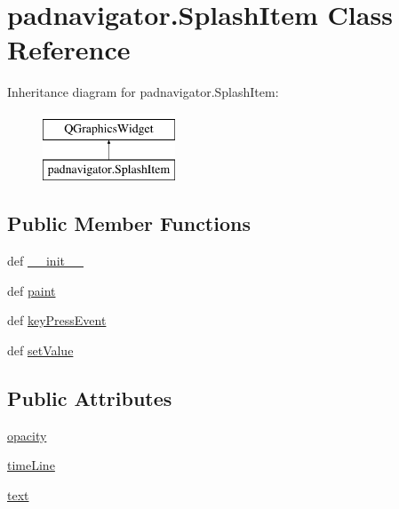 \hypertarget{classpadnavigator_1_1SplashItem}{}\section{padnavigator.\+Splash\+Item Class Reference}
\label{classpadnavigator_1_1SplashItem}
Inheritance diagram for padnavigator.\+Splash\+Item\+:\begin{figure}[H]
\begin{center}
\leavevmode
\includegraphics[height=2.000000cm]{classpadnavigator_1_1SplashItem}
\end{center}
\end{figure}
\subsection*{Public Member Functions}
\begin{DoxyCompactItemize}
\item 
def \hyperlink{classpadnavigator_1_1SplashItem_aa678bd9fc04cf7fa7a16662b0a31145d}{\+\_\+\+\_\+init\+\_\+\+\_\+}
\item 
def \hyperlink{classpadnavigator_1_1SplashItem_aa025a4136c98b96b0d553bb9687ef945}{paint}
\item 
def \hyperlink{classpadnavigator_1_1SplashItem_adbfbf41adfe7b346653c47d69cc3293c}{key\+Press\+Event}
\item 
def \hyperlink{classpadnavigator_1_1SplashItem_af2b6f16a576fdfcc10b2963225afa318}{set\+Value}
\end{DoxyCompactItemize}
\subsection*{Public Attributes}
\begin{DoxyCompactItemize}
\item 
\hyperlink{classpadnavigator_1_1SplashItem_a8c6b612356d632b765040169e5069560}{opacity}
\item 
\hyperlink{classpadnavigator_1_1SplashItem_a9eeb9c5c97fcab32afe76284c36b4fe8}{time\+Line}
\item 
\hyperlink{classpadnavigator_1_1SplashItem_aa8845c6194cb44557e6fd1742c151806}{text}
\end{DoxyCompactItemize}


